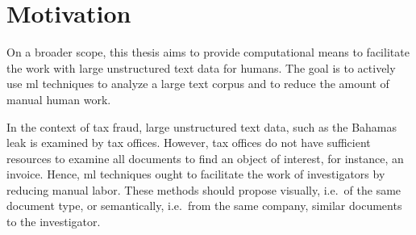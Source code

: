 \section{Motivation}\label{sec:motivation}

On a broader scope, this thesis aims to provide computational means to facilitate the work with large unstructured text data for humans.
The goal is to actively use \ac{ml} techniques to analyze a large text corpus and to reduce the amount of manual human work.

In the context of tax fraud, large unstructured text data, such as the Bahamas leak is examined by tax offices.
However, tax offices do not have sufficient resources to examine all documents to find an object of interest, for instance, an invoice.
Hence, \ac{ml} techniques ought to facilitate the work of investigators by reducing manual labor.
These methods should propose visually, i.e.\ of the same document type, or semantically, i.e.\ from the same company, similar documents to the investigator.